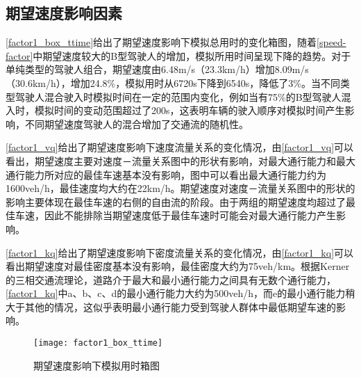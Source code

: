    \renewcommand{\topfraction}{0.9}	%
    \renewcommand{\bottomfraction}{0.8}	%
    \setcounter{topnumber}{2}
    \setcounter{bottomnumber}{2}
    \setcounter{totalnumber}{4}     %
    \setcounter{dbltopnumber}{2}    %
    \renewcommand{\dbltopfraction}{0.9}	%
    \renewcommand{\textfraction}{0.00}	%
    \renewcommand{\floatpagefraction}{0.7}	%
    \renewcommand{\dblfloatpagefraction}{0.7}	%



\subsection{期望速度影响因素}
\autoref{factor1_box_ttime}给出了期望速度影响下模拟总用时的变化箱图，随着\autoref{speed-factor}中期望速度较大的B型驾驶人的增加，模拟所用时间呈现下降的趋势。对于单纯类型的驾驶人组合，期望速度由6.48m/s（23.3km/h）增加8.09m/s（30.6km/h），增加24.8\%，模拟用时从6720s下降到6540s，降低了3\%。当不同类型驾驶人混合驶入时模拟时间在一定的范围内变化，例如当有75\%的B型驾驶人混入时，模拟时间的变动范围超过了200s，这表明车辆的驶入顺序对模拟时间产生影响，不同期望速度驾驶人的混合增加了交通流的随机性。

\autoref{factor1_vq}给出了期望速度影响下速度流量关系的变化情况，由\autoref{factor1_vq}可以看出，期望速度主要对速度－流量关系图中的形状有影响，对最大通行能力和最大通行能力所对应的最佳车速基本没有影响，图中可以看出最大通行能力约为1600veh/h，最佳速度均大约在22km/h。期望速度对速度－流量关系图中的形状的影响主要体现在最佳车速的右侧的自由流的阶段。由于两组的期望速度均超过了最佳车速，因此不能排除当期望速度低于最佳车速时可能会对最大通行能力产生影响。


\autoref{factor1_kq}给出了期望速度影响下密度流量关系的变化情况，由\autoref{factor1_kq}可以看出期望速度对最佳密度基本没有影响，最佳密度大约为75veh/km。根据Kerner的三相交通流理论，道路介于最大和最小通行能力之间具有无数个通行能力，\autoref{factor1_kq}中a、b、c、d的最小通行能力大约为500veh/h，而e的最小通行能力稍大于其他的情况，这似乎表明最小通行能力受到驾驶人群体中最低期望车速的影响。

\begin{figure}[htb]
\begin{center}
\texttt{[image: factor1\_box\_ttime]}
\caption{期望速度影响下模拟用时箱图}
\label{factor1_box_ttime}
\end{center}
\end{figure}



